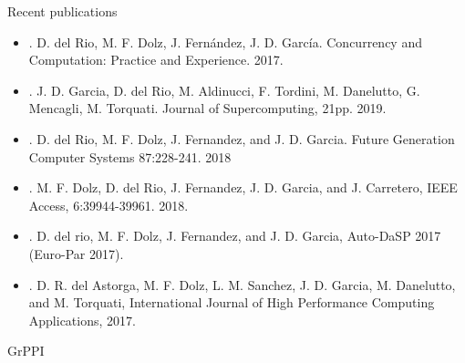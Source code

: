 \begin{frame}[t]{Recent publications}
\begin{scriptsize}
\begin{itemize}
\item
{}. 
D. del Rio, M. F. Dolz, J. Fernández, J. D. García. 
Concurrency and Computation: Practice and Experience. 
2017.
\vfill
\item
{}.
J. D. Garcia, D. del Rio, M. Aldinucci, F. Tordini, M. Danelutto, G. Mencagli, M. Torquati.
Journal of Supercomputing, 21pp. 2019.
\item
{}.
D. del Rio, M. F. Dolz, J. Fernandez, and J. D. Garcia.
Future Generation Computer Systems 87:228-241. 
2018
\item
{}.
M. F. Dolz, D. del Rio, J. Fernandez, J. D. Garcia, and J. Carretero,
IEEE Access, 6:39944-39961. 2018.
\item
{}.
D. del rio, M. F. Dolz, J. Fernandez, and J. D. Garcia, 
Auto-DaSP 2017 (Euro-Par 2017).
\item
{}.
D. R. del Astorga, M. F. Dolz, L. M. Sanchez, J. D. Garcia, M. Danelutto, and M. Torquati, 
International Journal of High Performance Computing Applications, 2017.
\end{itemize}
\end{scriptsize}
\end{frame}

\begin{frame}{GrPPI}
\begin{Large}
\end{Large}
\end{frame}
